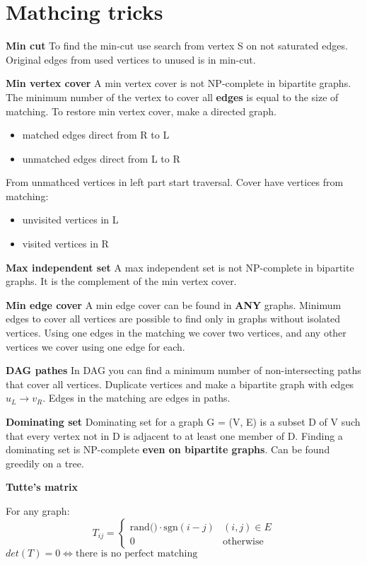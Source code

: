 \section{Mathcing tricks}
\textbf{Min cut}
To find the min-cut use search from vertex S on not saturated edges. 
Original edges from used vertices to unused is in min-cut.

\textbf{Min vertex cover}
A min vertex cover is not NP-complete in bipartite graphs. 
The minimum number of the vertex to cover all \textbf{edges} is equal to the size of matching. 
To restore min vertex cover, make a directed graph.

\begin{itemize}
\setlength\itemsep{0em}
\item matched edges direct from R to L
\item unmatched edges direct from L to R
\end{itemize}

From unmathced vertices in left part start traversal.
Cover have vertices from matching:
\begin{itemize}
\setlength\itemsep{0em}
\item unvisited vertices in L 
\item visited vertices in R
\end{itemize}

\textbf{Max independent set}
A max independent set is not NP-complete in bipartite graphs. 
It is the complement of the min vertex cover.

\textbf{Min edge cover}
A min edge cover can be found in \textbf{ANY} graphs. 
Minimum edges to cover all vertices are possible to find only in graphs without isolated vertices. 
Using one edges in the matching we cover two vertices, 
and any other vertices we cover using one edge for each. 

\textbf{DAG pathes}
In DAG you can find a minimum number of non-intersecting paths that cover all vertices. 
Duplicate vertices and make a bipartite graph with edges $u_L \rightarrow v_R$. 
Edges in the matching are edges in paths.

\textbf{Dominating set}
Dominating set for a graph G = (V, E) is a subset D of V such that every
vertex not in D is adjacent to at least one member of D. Finding a dominating set
is NP-complete \textbf{even on bipartite graphs}.
Can be found greedily on a tree.

\textbf{Tutte's matrix}

For any graph:
\[
T_{ij} = \begin{cases} 
      \text{rand()} \cdot \text{sgn}(i - j) & (i, j) \in E \\
      0 & \text{otherwise}
   \end{cases}
\]
$det(T) = 0 \iff \text{there is no perfect matching}$


\bigskip 
